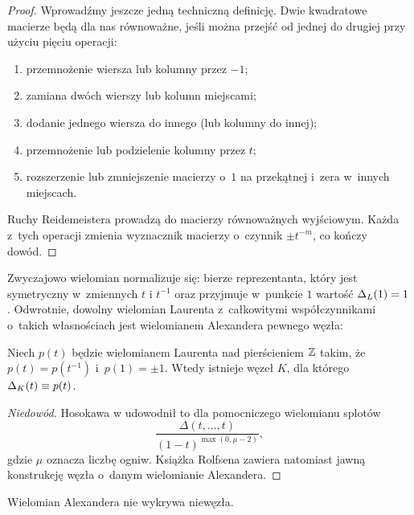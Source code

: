 \begin{proof}
    Wprowadźmy jeszcze jedną techniczną definicję.
    Dwie kwadratowe macierze będą dla nas równoważne, jeśli można przejść od jednej do drugiej przy użyciu pięciu operacji:
    \begin{enumerate}
        \item przemnożenie wiersza lub kolumny przez $-1$;
        \item zamiana dwóch wierszy lub kolumn miejscami;
        \item dodanie jednego wiersza do innego (lub kolumny do innej);
        \item przemnożenie lub podzielenie kolumny przez $t$;
        \item rozszerzenie lub zmniejszenie macierzy o~$1$ na przekątnej i~zera w~innych miejscach.
    \end{enumerate}

    Ruchy Reidemeistera prowadzą do macierzy równoważnych wyjściowym.
    Każda z~tych operacji zmienia wyznacznik macierzy o~czynnik $\pm t^{-m}$, co kończy dowód.
\end{proof}

Zwyczajowo wielomian normalizuje się: bierze reprezentanta, który jest symetryczny w~zmiennych $t$ i $t^{-1}$ oraz przyjmuje w~punkcie $1$ wartość $\Delta_L(1) = 1$.
Odwrotnie, dowolny wielomian Laurenta z~całkowitymi współczynnikami o~takich własnościach jest wielomianem Alexandera pewnego węzła:

\begin{proposition}
\label{prp:alexander_hosokawa}%
    Niech $p(t)$ będzie wielomianem Laurenta nad pierścieniem $\mathbb Z$ takim, że $p(t) = p(t^{-1})$ i~$p(1) = \pm 1$.
    Wtedy istnieje węzeł $K$, dla którego $\Delta_K(t) \equiv p(t)$.
\end{proposition}

\begin{proof}[Niedowód]
%
    Hosokawa w \cite{hosokawa1958} udowodnił to dla pomocniczego wielomianu splotów
    \begin{equation}
        \frac{\Delta(t, \ldots, t)}{(1-t)^{\max(0, \mu - 2)}},
    \end{equation}
    gdzie $\mu$ oznacza liczbę ogniw.
    Książka Rolfsena \cite[s. 171-172]{rolfsen1976} zawiera natomiast jawną konstrukcję węzła o~danym wielomianie Alexandera.
\end{proof}

\begin{proposition}
\label{alexander_no_detects_unknot}%
    Wielomian Alexandera nie wykrywa niewęzła.
\end{proposition}

